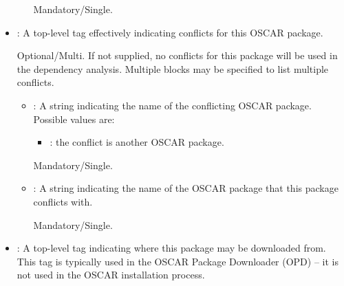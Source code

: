 \begin{itemize}
\begin{itemize}
    Mandatory/Single.
  \end{itemize}
    
\item {}: A top-level tag effectively indicating
  conflicts for this OSCAR package.
  
  Optional/Multi.  If not supplied, no conflicts for this package will
  be used in the dependency analysis.  Multiple 
  blocks may be specified to list multiple conflicts.

  \begin{itemize}
  \item {}: A string indicating the name of the conflicting
    OSCAR package.  Possible values are:

    \begin{itemize}
    \item {}: the conflict is another OSCAR package.
    \end{itemize}

    Mandatory/Single.
    

    
    
  \item {}: A string indicating the name of the OSCAR
    package that this package conflicts with.

    Mandatory/Single.
    
  \end{itemize}
  
\item {}: A top-level tag indicating where this package
  may be downloaded from.  This tag is typically used in the OSCAR
  Package Downloader (OPD) -- it is not used in the OSCAR installation
  process.
  

\end{itemize}
